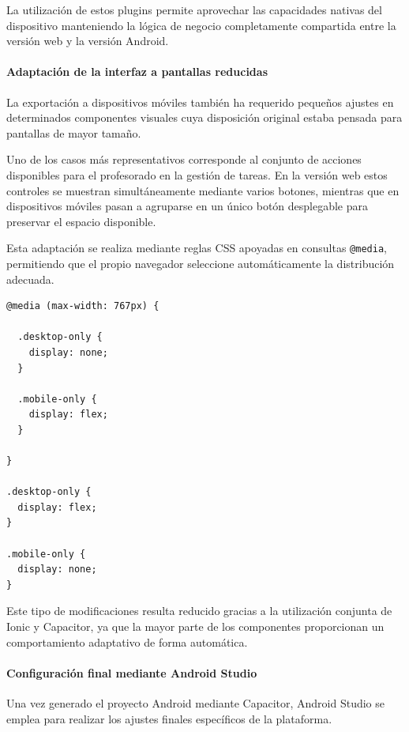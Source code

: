La utilización de estos plugins permite aprovechar las capacidades nativas del dispositivo manteniendo la lógica de negocio completamente compartida entre la versión web y la versión Android.

\paragraph{Adaptación de la interfaz a pantallas reducidas}

La exportación a dispositivos móviles también ha requerido pequeños ajustes en determinados componentes visuales cuya disposición original estaba pensada para pantallas de mayor tamaño.

Uno de los casos más representativos corresponde al conjunto de acciones disponibles para el profesorado en la gestión de tareas. En la versión web estos controles se muestran simultáneamente mediante varios botones, mientras que en dispositivos móviles pasan a agruparse en un único botón desplegable para preservar el espacio disponible.

Esta adaptación se realiza mediante reglas CSS apoyadas en consultas \texttt{@media}, permitiendo que el propio navegador seleccione automáticamente la distribución adecuada.

\begin{Verbatim}[frame=single, fontsize=\small, xleftmargin=10pt, xrightmargin=10pt]
@media (max-width: 767px) {

  .desktop-only {
    display: none;
  }

  .mobile-only {
    display: flex;
  }

}

.desktop-only {
  display: flex;
}

.mobile-only {
  display: none;
}
\end{Verbatim}

Este tipo de modificaciones resulta reducido gracias a la utilización conjunta de Ionic y Capacitor, ya que la mayor parte de los componentes proporcionan un comportamiento adaptativo de forma automática.

\paragraph{Configuración final mediante Android Studio}

Una vez generado el proyecto Android mediante Capacitor, Android Studio se emplea para realizar los ajustes finales específicos de la plataforma.


